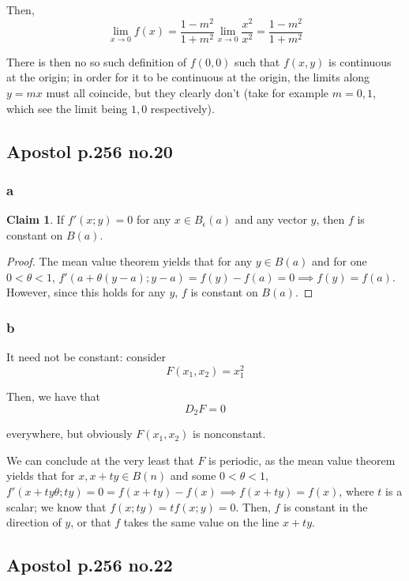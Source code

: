 \documentclass[12pt,letterpaper]{article}
\theoremstyle{definition}
\newtheorem*{claim}{Claim}
\begin{document}
Then,
\[
  \lim_{x \rightarrow 0}f(x) = \frac{1-m^2}{1+m^2} \lim_{x\rightarrow
    0}\frac{x^2}{x^2} = \frac{1-m^2}{1+m^2}
\]

There is then no so such definition of $f(0, 0)$ such that $f(x ,y)$ is continuous
at the origin; in order for it to be continuous at the origin, the limits along
$y = mx$ must all coincide, but they clearly don't (take for example $m = 0,1$,
which see the limit being $1, 0$ respectively).

\subsection*{Apostol p.256 no.20}

\subsubsection*{a}

\begin{claim}
  If $f'(x; y) = 0$ for any $x \in B_\epsilon(a)$ and any vector $y$, then $f$
  is constant on $B(a)$.
\end{claim}

\begin{proof}
  The mean value theorem yields that for any $y \in B(a)$ and for one $0 < \theta
  < 1$,  $f'(a + \theta (y -a); y-a) = f(y) - f(a) = 0 \implies f(y) = f(a)$. However, since
  this holds for any $y$, $f$ is constant on $B(a)$.
\end{proof}

\subsubsection*{b}

It need not be constant: consider
\[
  F(x_1, x_2) = x_1^2
\]

Then, we have that
\[
  D_2F = 0
\]

everywhere, but obviously $F(x_1, x_2)$ is nonconstant.

We can conclude at the very least that $F$ is periodic, as the mean value
theorem yields that for $x, x + ty \in B(n)$ and some $0 < \theta < 1$, $f'(x + ty\theta; ty) = 0 =
f(x + ty) - f(x) \implies
f(x + ty) = f(x)$, where $t$ is a scalar; we know that $f(x; ty) = tf(x; y) =
0$. Then, $f$ is constant in the direction of $y$, or that $f$ takes the same
value on the line $x + ty$.

\subsection*{Apostol p.256 no.22}
\end{document}
